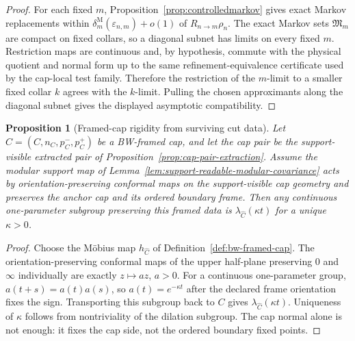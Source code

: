\documentclass[11pt]{article}
\newtheorem{proposition}[theorem]{Proposition}
\begin{document}
\begin{proof}
For each fixed \(m\), Proposition~\ref{prop:controlledmarkov} gives exact
Markov replacements within
\(\delta^{\mathrm M}_{m}(\varepsilon_{n,m})+o(1)\) of \(R_{n\to m}\rho_n\).
The exact Markov sets \(\mathfrak M_m\) are compact on fixed collars, so a
diagonal subnet has limits on every fixed \(m\). Restriction maps are
continuous and, by hypothesis, commute with the physical quotient and normal
form up to the same refinement-equivalence certificate used by the cap-local
test family. Therefore the restriction of the \(m\)-limit to a smaller fixed
collar \(k\) agrees with the \(k\)-limit. Pulling the chosen approximants along
the diagonal subnet gives the displayed asymptotic compatibility.
\end{proof}

\begin{proposition}[Framed-cap rigidity from surviving cut data]\label{prop:round-cap-rigidity}
Let \(\widehat C=(C,n_C,p_C^-,p_C^+)\) be a BW-framed cap, and let the cap pair be the
support-visible extracted pair of Proposition~\ref{prop:cap-pair-extraction}. Assume the modular
support map of Lemma~\ref{lem:support-readable-modular-covariance} acts by orientation-preserving
conformal maps on the support-visible cap geometry and preserves the anchor cap and its ordered
boundary frame. Then any continuous one-parameter subgroup preserving this framed data is
\(\lambda_{\widehat C}(\kappa t)\) for a unique \(\kappa>0\).
\end{proposition}

\begin{proof}
Choose the M\"obius map \(h_{\widehat C}\) of Definition~\ref{def:bw-framed-cap}. The
orientation-preserving conformal maps of the upper half-plane preserving \(0\) and \(\infty\)
individually are exactly \(z\mapsto a z\), \(a>0\). For a continuous one-parameter group,
\(a(t+s)=a(t)a(s)\), so \(a(t)=e^{-\kappa t}\) after the declared frame orientation fixes the sign.
Transporting this subgroup back to \(C\) gives \(\lambda_{\widehat C}(\kappa t)\). Uniqueness of
\(\kappa\) follows from nontriviality of the dilation subgroup. The cap normal alone is not enough:
it fixes the cap side, not the ordered boundary fixed points.
\end{proof}
\end{document}
